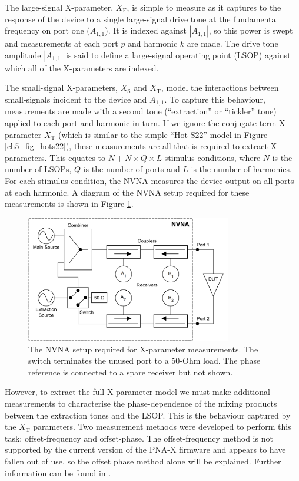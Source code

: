 \documentclass[../thesis/thesis.tex]{subfiles}
\begin{document}
The large-signal X-parameter, $X_\textrm{F}$, is simple to measure as it captures to the response of the device to a single large-signal drive tone at the fundamental frequency on port one ($A_{1,1}$). It is indexed against $|A_{1,1}|$, so this power is swept and measurements at each port $p$ and harmonic $k$ are made. The drive tone amplitude $|A_{1,1}|$ is said to define a large-signal operating point (LSOP) against which all of the X-parameters are indexed.

The small-signal X-parameters, $X_\textrm{S}$ and $X_\textrm{T}$, model the interactions between small-signals incident to the device and $A_{1,1}$. To capture this behaviour, measurements are made with a second tone (``extraction'' or ``tickler'' tone) applied to each port and harmonic in turn. If we ignore the conjugate term X-parameter $X_\textrm{T}$ (which is similar to the simple ``Hot S22'' model in Figure \ref{ch5_fig_hots22}), these measurements are all that is required to extract X-parameters. This equates to $N + N \times Q \times L$ stimulus conditions, where $N$ is the number of LSOPs, $Q$ is the number of ports and $L$ is the number of harmonics. For each stimulus condition, the NVNA measures the device output on all ports at each harmonic. A diagram of the NVNA setup required for these measurements is shown in Figure \ref{ch5_fig_nvna}.

\begin{figure}
	\centering
	\includegraphics[width=0.8\textwidth]{nvna}
	\caption[NVNA setup required for X-parameter measurements.]{The NVNA setup required for X-parameter measurements. The switch terminates the unused port to a 50-Ohm load. The phase reference is connected to a spare receiver but not shown.}
	\label{ch5_fig_nvna}
\end{figure}

However, to extract the full X-parameter model we must make additional measurements to characterise the phase-dependence of the mixing products between the extraction tones and the LSOP. This is the behaviour captured by the $X_\textrm{T}$ parameters. Two measurement methods were developed to perform this task: offset-frequency and offset-phase. The offset-frequency method is not supported by the current version of the PNA-X firmware and appears to have fallen out of use, so the offset phase method alone will be explained. Further information can be found in \cite{Root_2013}.
\end{document}
